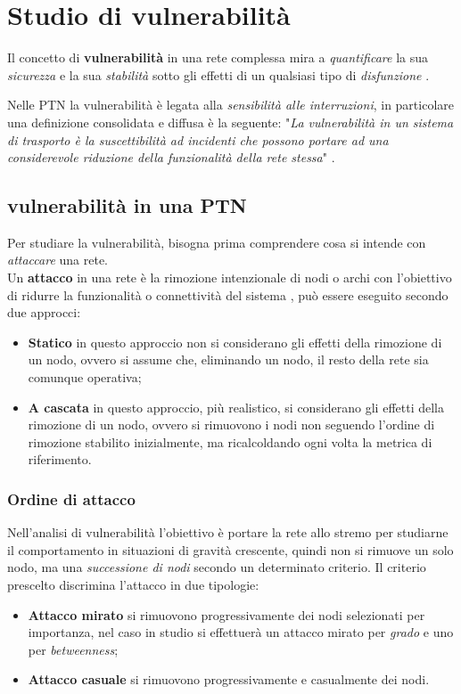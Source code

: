 \chapter{Studio di vulnerabilità}
\label{cap5}

Il concetto di \textbf{vulnerabilità} in una rete complessa mira a \textit{quantificare} la sua \textit{sicurezza} e la sua \textit{stabilità} sotto gli effetti di un qualsiasi tipo di \textit{disfunzione} \cite{MattssonJenelius2015}.

Nelle PTN la vulnerabilità è legata alla \textit{sensibilità alle interruzioni}, in particolare una definizione consolidata e diffusa è la seguente: "\textit{La vulnerabilità in un sistema di trasporto è la suscettibilità ad incidenti che possono portare ad una considerevole riduzione della funzionalità della rete stessa}" \cite{Berdica2002}. 

\section{vulnerabilità in una PTN}
Per studiare la vulnerabilità, bisogna prima comprendere cosa si intende con \textit{attaccare} una rete. \\
Un \textbf{attacco} in una rete è la rimozione intenzionale di nodi o archi con l’obiettivo di ridurre la funzionalità o connettività del sistema \cite{vonFerber2012LondonParis}, può essere eseguito secondo due approcci:
\begin{itemize}
    \item \textbf{Statico} in questo approccio non si considerano gli effetti della rimozione di un nodo, ovvero si assume che, eliminando un nodo, il resto della rete sia comunque operativa;
    \item \textbf{A cascata} in questo approccio, più realistico, si considerano gli effetti della rimozione di un nodo, ovvero si rimuovono i nodi non seguendo l'ordine di rimozione stabilito inizialmente, ma ricalcoldando ogni volta la metrica di riferimento.
\end{itemize}

\subsection{Ordine di attacco}
Nell'analisi di vulnerabilità l'obiettivo è portare la rete allo stremo per studiarne il comportamento in situazioni di gravità crescente, quindi non si rimuove un solo nodo, ma una \textit{successione di nodi} secondo un determinato criterio. Il criterio prescelto discrimina l'attacco in due tipologie:
\begin{itemize}
    \item \textbf{Attacco mirato} si rimuovono progressivamente dei nodi selezionati per importanza, nel caso in studio si effettuerà un attacco mirato per \textit{grado} e uno per \textit{betweenness};
    \item \textbf{Attacco casuale} si rimuovono progressivamente e casualmente dei nodi.
\end{itemize}

